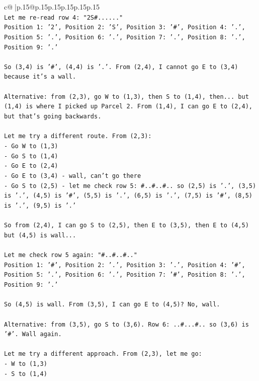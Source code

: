 \documentclass{article}
\begin{document}
{\begin{supertabular}{c@{$\;$}|p{.15\linewidth}@{}p{.15\linewidth}p{.15\linewidth}p{.15\linewidth}p{.15\linewidth}p{.15\linewidth}}
{{{\\ 
\texttt{Let me re{-}read row 4: "2S\#......"} \\
\texttt{Position 1: '2', Position 2: 'S', Position 3: '\#', Position 4: '.', Position 5: '.', Position 6: '.', Position 7: '.', Position 8: '.', Position 9: '.'} \\
\\ 
\texttt{So (3,4) is '\#', (4,4) is '.'. From (2,4), I cannot go E to (3,4) because it's a wall.} \\
\\ 
\texttt{Alternative: from (2,3), go W to (1,3), then S to (1,4), then... but (1,4) is where I picked up Parcel 2. From (1,4), I can go E to (2,4), but that's going backwards.} \\
\\ 
\texttt{Let me try a different route. From (2,3):} \\
\texttt{{-} Go W to (1,3)} \\
\texttt{{-} Go S to (1,4)} \\
\texttt{{-} Go E to (2,4)} \\
\texttt{{-} Go E to (3,4) {-} wall, can't go there} \\
\texttt{{-} Go S to (2,5) {-} let me check row 5: \#..\#..\#.. so (2,5) is '.', (3,5) is '.', (4,5) is '\#', (5,5) is '.', (6,5) is '.', (7,5) is '\#', (8,5) is '.', (9,5) is '.'} \\
\\ 
\texttt{So from (2,4), I can go S to (2,5), then E to (3,5), then E to (4,5) but (4,5) is wall...} \\
\\ 
\texttt{Let me check row 5 again: "\#..\#..\#.."} \\
\texttt{Position 1: '\#', Position 2: '.', Position 3: '.', Position 4: '\#', Position 5: '.', Position 6: '.', Position 7: '\#', Position 8: '.', Position 9: '.'} \\
\\ 
\texttt{So (4,5) is wall. From (3,5), I can go E to (4,5)? No, wall.} \\
\\ 
\texttt{Alternative: from (3,5), go S to (3,6). Row 6: ..\#...\#.. so (3,6) is '\#'. Wall again.} \\
\\ 
\texttt{Let me try a different approach. From (2,3), let me go:} \\
\texttt{{-} W to (1,3)} \\
\texttt{{-} S to (1,4)} \\
}}}
\end{supertabular}}
\end{document}
